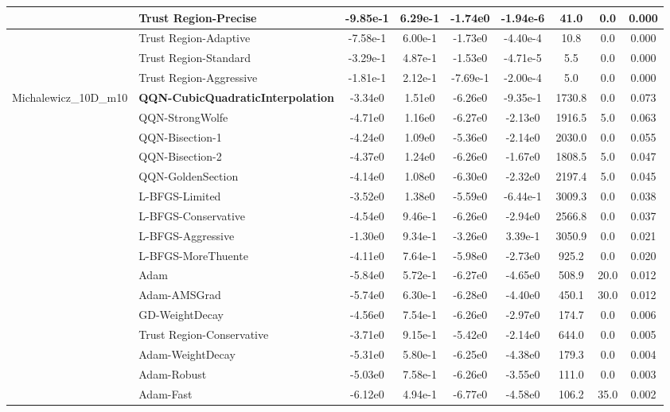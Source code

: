 \documentclass{article}
\begin{document}
\begin{longtable}{|l|l|c|c|c|c|c|c|c|}
\hline
 & Trust Region-Precise & -9.85e-1 & 6.29e-1 & -1.74e0 & -1.94e-6 & 41.0 & 0.0 & 0.000 \\
\hline
 & Trust Region-Adaptive & -7.58e-1 & 6.00e-1 & -1.73e0 & -4.40e-4 & 10.8 & 0.0 & 0.000 \\
\hline
 & Trust Region-Standard & -3.29e-1 & 4.87e-1 & -1.53e0 & -4.71e-5 & 5.5 & 0.0 & 0.000 \\
\hline
 & Trust Region-Aggressive & -1.81e-1 & 2.12e-1 & -7.69e-1 & -2.00e-4 & 5.0 & 0.0 & 0.000 \\
Michalewicz\_10D\_m10 & \textbf{QQN-CubicQuadraticInterpolation} & -3.34e0 & 1.51e0 & -6.26e0 & -9.35e-1 & 1730.8 & 0.0 & 0.073 \\
\hline
 & QQN-StrongWolfe & -4.71e0 & 1.16e0 & -6.27e0 & -2.13e0 & 1916.5 & 5.0 & 0.063 \\
\hline
 & QQN-Bisection-1 & -4.24e0 & 1.09e0 & -5.36e0 & -2.14e0 & 2030.0 & 0.0 & 0.055 \\
\hline
 & QQN-Bisection-2 & -4.37e0 & 1.24e0 & -6.26e0 & -1.67e0 & 1808.5 & 5.0 & 0.047 \\
\hline
 & QQN-GoldenSection & -4.14e0 & 1.08e0 & -6.30e0 & -2.32e0 & 2197.4 & 5.0 & 0.045 \\
\hline
 & L-BFGS-Limited & -3.52e0 & 1.38e0 & -5.59e0 & -6.44e-1 & 3009.3 & 0.0 & 0.038 \\
\hline
 & L-BFGS-Conservative & -4.54e0 & 9.46e-1 & -6.26e0 & -2.94e0 & 2566.8 & 0.0 & 0.037 \\
\hline
 & L-BFGS-Aggressive & -1.30e0 & 9.34e-1 & -3.26e0 & 3.39e-1 & 3050.9 & 0.0 & 0.021 \\
\hline
 & L-BFGS-MoreThuente & -4.11e0 & 7.64e-1 & -5.98e0 & -2.73e0 & 925.2 & 0.0 & 0.020 \\
\hline
 & Adam & -5.84e0 & 5.72e-1 & -6.27e0 & -4.65e0 & 508.9 & 20.0 & 0.012 \\
\hline
 & Adam-AMSGrad & -5.74e0 & 6.30e-1 & -6.28e0 & -4.40e0 & 450.1 & 30.0 & 0.012 \\
\hline
 & GD-WeightDecay & -4.56e0 & 7.54e-1 & -6.26e0 & -2.97e0 & 174.7 & 0.0 & 0.006 \\
\hline
 & Trust Region-Conservative & -3.71e0 & 9.15e-1 & -5.42e0 & -2.14e0 & 644.0 & 0.0 & 0.005 \\
\hline
 & Adam-WeightDecay & -5.31e0 & 5.80e-1 & -6.25e0 & -4.38e0 & 179.3 & 0.0 & 0.004 \\
\hline
 & Adam-Robust & -5.03e0 & 7.58e-1 & -6.26e0 & -3.55e0 & 111.0 & 0.0 & 0.003 \\
\hline
 & Adam-Fast & -6.12e0 & 4.94e-1 & -6.77e0 & -4.58e0 & 106.2 & 35.0 & 0.002 \\

\end{longtable}
\end{document}
